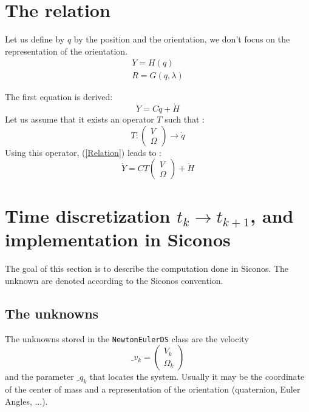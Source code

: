 \section{The relation}

Let us define by $q$ by  the position and the orientation, we don't focus on the  representation of the orientation.
\begin{equation}
\label{Relation}
\begin{array}{l}
Y=H(q)  \\
R=G(q,\lambda)
\end{array}
\end{equation}


The first equation is derived:
\[\dot Y = C \dot q + \dot H\]
Let us assume that it exists an operator $T$ such that :
\[T:  \left(\begin{array}{l} V\\ \Omega\end{array}\right) \to \dot q \]
Using  this operator, (\ref{Relation}) leads to :
\[\dot Y = C T \left(\begin{array}{l} V\\ \Omega\end{array}\right) + \dot H\]

\section{Time discretization $t_k \to t_{k+1}$, and implementation in Siconos}
\label{Sec:NE_TD}
The goal of this section is to describe the computation done in Siconos. The unknown are denoted according to the Siconos convention.
\subsection{The unknowns}

The unknowns stored in the \texttt{NewtonEulerDS} class are the velocity
\[\_v_{k}=\left(\begin{array}{c} V_k\\ \Omega _{k}\end{array}\right)\]
and  the parameter $\_q_{k}$ that locates the system. Usually it may be the coordinate of the center of mass and a representation of the orientation (quaternion, Euler Angles, ...).

